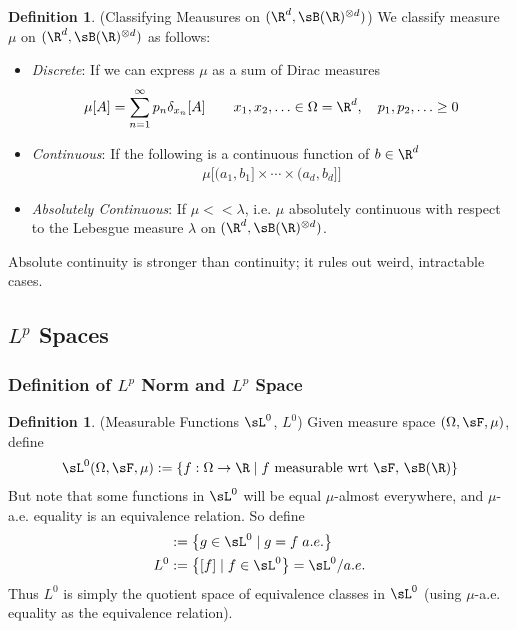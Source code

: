 \documentclass[12pt]{article}
\theoremstyle{plain}
\theoremstyle{definition}
\newtheorem{defn}[thm]{Definition}
\theoremstyle{remark}
\newcommand{\ra}{\rightarrow}
\newcommand{\ninf}{_{n=1}^\infty}
\begin{document}
\begin{defn}
(Classifying Meausures on $(\R^d,\sB(\R)^{\otimes d})$)
We classify measure $\mu$ on $(\R^d,\sB(\R)^{\otimes d})$ as follows:
\begin{itemize}
  \item \emph{Discrete}: If we can express $\mu$ as a sum of Dirac
    measures
    \begin{align*}
      \mu[A] = \sum\ninf p_n \delta_{x_n}[A]
      \qquad x_1,x_2,\ldots\in\Omega=\R^d,
      \quad
      p_1,p_2,\ldots\geq 0
    \end{align*}

  \item \emph{Continuous}: If the following is a continuous function of
    $b\in \R^d$
    \begin{align*}
      \mu\big[
        (a_1,b_1] \times\cdots\times (a_d,b_d]
      \big]
    \end{align*}

  \item \emph{Absolutely Continuous}:
    If $\mu<<\lambda$, i.e. $\mu$ absolutely continuous with respect to
    the Lebesgue measure $\lambda$ on $(\R^d,\sB(\R)^{\otimes d})$.
\end{itemize}
Absolute continuity is stronger than continuity; it rules out weird,
intractable cases.
\end{defn}





\clearpage
\subsection{$L^p$ Spaces}

\subsubsection{Definition of $L^p$ Norm and $L^p$ Space}

\begin{defn}(Measurable Functions $\sL^0$, $L^0$)
Given measure space $(\Omega,\sF,\mu)$, define
\begin{align*}
  \sL^0(\Omega,\sF,\mu) :=
  \left\{ f:\Omega\ra\R \; |\; \text{$f$ measurable wrt $\sF$, $\sB(\R)$} \right\}
\end{align*}
But note that some functions in $\sL^0$ will be equal $\mu$-almost
everywhere, and $\mu$-a.e. equality is an equivalence relation. So
define
\begin{align*}
  [f] &:= \left\{ g\in \sL^0 \;|\; g=f \; a.e. \right\} \\
  L^0 &:= \left\{ [f] \;|\; f\in\sL^0 \right\}
  = \sL^0 / a.e.
\end{align*}
Thus $L^0$ is simply the quotient space of equivalence classes in
$\sL^0$ (using $\mu$-a.e. equality as the equivalence relation).
\end{defn}
\end{document}
